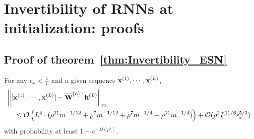 \section{Invertibility of RNNs at initialization: proofs}
\subsection{Proof of theorem~\ref{thm:Invertibility_ESN}}
\begin{theorem}\label{thm:Invertibility_ESN_proof}
	For any $\epsilon_x < \frac{1}{L}$ and a given sequence $\mathbf{x}^{(1)}, \cdots, \mathbf{x}^{(L)}$, 
	\begin{align*}
		&\norm{[\mathbf{x}^{(1)}, \cdots, \mathbf{x}^{(L)}] - \overline{\mathbf{W}}^{[L]\top} \mathbf{h}^{(L)}}_\infty \\&\quad \leq \mathcal{O}\left(L^4 \cdot (\rho^{11} m^{-1/12} + \rho^{7} m^{-1/12} + \rho^{7} m^{-1/4} + \rho^{11} m^{-1/4})  \right) + \mathcal{O}(\rho^2 L^{11/6} \epsilon_x^{5/3})
	\end{align*}
	with probability at least $1 - e^{-\Omega(\rho^2)}$. 
\end{theorem}


